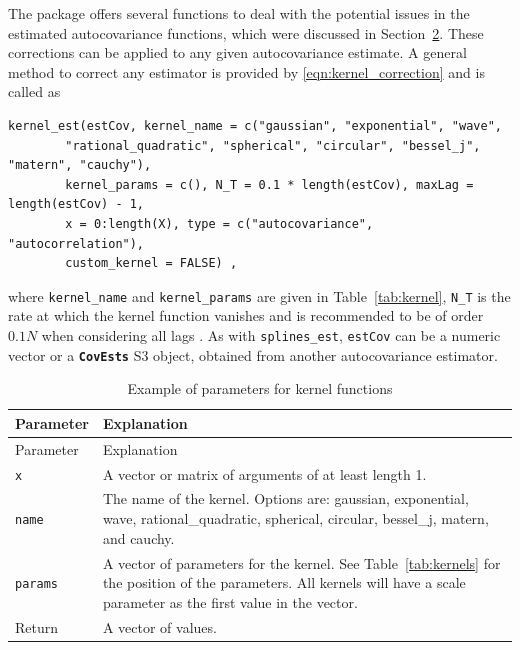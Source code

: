 The package offers several functions to deal with the potential issues
in the estimated autocovariance functions, which were discussed in
Section~\hyperref[sec:nonparametric]{2}. These corrections can be
applied to any given autocovariance estimate. A general method to
correct any estimator is provided by \eqref{eqn:kernel_correction} and
is called as

\begin{verbatim}
kernel_est(estCov, kernel_name = c("gaussian", "exponential", "wave",
        "rational_quadratic", "spherical", "circular", "bessel_j", "matern", "cauchy"),
        kernel_params = c(), N_T = 0.1 * length(estCov), maxLag = length(estCov) - 1,
        x = 0:length(X), type = c("autocovariance", "autocorrelation"),
        custom_kernel = FALSE) ,
\end{verbatim}

where \texttt{kernel\_name} and \texttt{kernel\_params} are given in
Table~\ref{tab:kernel}, \texttt{N\_T} is the rate at which the kernel
function vanishes and is recommended to be of order \(0.1 N\) when
considering all lags \citep[Section~3.17]{Yaglom1987}. As with
\texttt{splines\_est}, \texttt{estCov} can be a numeric vector or a
\textbf{\texttt{CovEsts}} S3 object, obtained from another
autocovariance estimator.

\centering

\protect{}\label{tab:kernel}
\begin{longtable}[]{@{}
  >{\raggedright\arraybackslash}p{}
  >{\raggedright\arraybackslash}p{}@{}}
\caption{Example of parameters for kernel functions}\tabularnewline
\toprule\noalign{}
Parameter & \begin{minipage}[b]{\linewidth}\raggedright
Explanation
\end{minipage} \\
\midrule\noalign{}
\endfirsthead
\toprule\noalign{}
Parameter & \begin{minipage}[b]{\linewidth}\raggedright
Explanation
\end{minipage} \\
\midrule\noalign{}
\endhead
\bottomrule\noalign{}
\endlastfoot
\texttt{x} & A vector or matrix of arguments of at least length 1. \\
\texttt{name} & The name of the kernel. Options are: gaussian,
exponential, wave, rational\_quadratic, spherical, circular, bessel\_j,
matern, and cauchy. \\
\texttt{params} & A vector of parameters for the kernel. See
Table~\ref{tab:kernels} for the position of the parameters. All kernels
will have a scale parameter as the first value in the vector. \\
Return & A vector of values. \\
\end{longtable}

